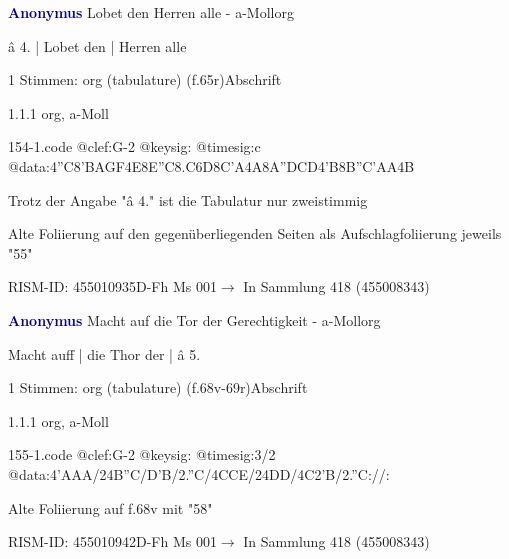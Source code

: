 \documentclass[twocolumn, 12pt]{book}
\begin{document}
\par \vspace{16pt} \textcolor{darkblue}{\textbf{Anonymus  }}\hfillplus{\textbf{[154]}}\newline Lobet den Herren alle - a-Moll\newline org
\par \begin{itshape}[f.65r, at left:] â 4. | Lobet den | Herren alle\end{itshape} 
\par \textcolor{darkblue}{}  1 Stimmen: org (tabulature)  (f.65r)\newline Abschrift
\par 1.1.1  org, a-Moll  
\begin{filecontents*}{154-1.code}
@clef:G-2
@keysig:
@timesig:c
@data:4''C{8'BA}{GF}4E{8E''C8.C6D}{8C'A}4A{8A''DCD}4'B{8B''C}{'AA}4B
\end{filecontents*}
\newline %
\par Trotz der Angabe "â 4." ist die Tabulatur nur zweistimmig
\par Alte Foliierung auf den gegenüberliegenden Seiten als Aufschlagfoliierung jeweils "55"
\par RISM-ID: 455010935\newline D-Fh  Ms 001\newline $\rightarrow$ In Sammlung 418 (455008343)
      
\par \vspace{16pt} \textcolor{darkblue}{\textbf{Anonymus  }}\hfillplus{\textbf{[155]}}\newline Macht auf die Tor der Gerechtigkeit - a-Moll\newline org
\par \begin{itshape}[f.68v, at left:] Macht auff | die Thor der | â 5.\end{itshape} 
\par \textcolor{darkblue}{}  1 Stimmen: org (tabulature)  (f.68v-69r)\newline Abschrift
\par 1.1.1  org, a-Moll  
\begin{filecontents*}{155-1.code}
@clef:G-2
@keysig:
@timesig:3/2
@data:4'AAA/24B''C/D'B/2.''C/4CCE/24DD/4C2'B/2.''C://:
\end{filecontents*}
\newline %
\par Alte Foliierung auf f.68v mit "58"
\par RISM-ID: 455010942\newline D-Fh  Ms 001\newline $\rightarrow$ In Sammlung 418 (455008343)
      
\end{document}
